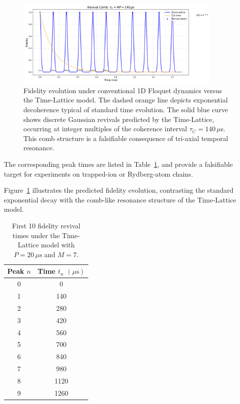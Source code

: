 \documentclass[11pt]{article}
\begin{document}
\begin{figure}[htbp!]
  \centering
  \includegraphics[width=0.9\textwidth]{figures/revival_comb_plot_final.png}
  \caption{Fidelity evolution under conventional 1D Floquet dynamics versus the Time-Lattice model. The dashed orange line depicts exponential decoherence typical of standard time evolution. The solid blue curve shows discrete Gaussian revivals predicted by the Time-Lattice, occurring at integer multiples of the coherence interval $\tau_C = 140\,\mu$s. This comb structure is a falsifiable consequence of tri-axial temporal resonance.}
  \label{fig:comb}
\end{figure}

The corresponding peak times are listed in Table~\ref{tab:comb}, and provide a falsifiable target for experiments on trapped-ion or Rydberg-atom chains.

Figure~\ref{fig:comb} illustrates the predicted fidelity evolution, contrasting the standard exponential decay with the comb-like resonance structure of the Time-Lattice model.

\begin{table}[htbp!]
  \centering
  \begin{tabular}{cc}
    \toprule
    Peak $n$ & Time $t_n$ $(\mu\text{s})$ \\
    \midrule
    0 & 0 \\
    1 & 140 \\
    2 & 280 \\
    3 & 420 \\
    4 & 560 \\
    5 & 700 \\
    6 & 840 \\
    7 & 980 \\
    8 & 1120 \\
    9 & 1260 \\
    \bottomrule
  \end{tabular}
  \caption{First 10 fidelity revival times under the Time-Lattice model with $P = 20\,\mu\text{s}$ and $M = 7$.}
  \label{tab:comb}
\end{table}
\end{document}
